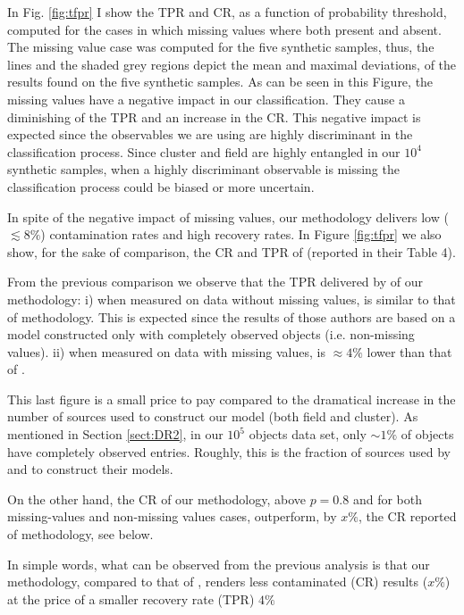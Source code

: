 In Fig. \ref{fig:tfpr} I show the TPR and CR, as a function of probability threshold, computed for the cases in which missing values where both present and absent. The missing value case was computed for the five synthetic samples, thus, the lines and the shaded grey regions depict the mean and maximal deviations, of the results found on the five synthetic samples. As can be seen in this Figure, the missing values have a negative impact in our classification. They cause a diminishing of the TPR  and an increase in the CR. This negative impact is expected since the observables we are using are highly discriminant in the classification process. Since cluster and field are highly entangled in our $10^4$ synthetic samples, when a highly discriminant observable is missing the classification process could be biased or more uncertain.

In spite of the negative impact of missing values, our methodology delivers low ($\lesssim 8\%$) contamination rates and high recovery rates. In Figure \ref{fig:tfpr} we also show, for the sake of comparison, the CR and TPR of \citet{Sarro2014} (reported in their Table 4). 

From the previous comparison we observe that the TPR delivered by of our methodology: i) when measured on data without missing values, is similar to that of \citet{Sarro2014} methodology. This is expected since the results of those authors are based on a model constructed only with completely observed objects (i.e. non-missing values). ii) when measured on data with missing values, is $\approx 4\%$ lower than that of \citet{Sarro2014}. 

This last figure is a small price to pay compared to the dramatical increase in the number of sources used to construct our model (both field and cluster). As mentioned in Section \ref{sect:DR2}, in our $10^5$ objects data set, only $\sim 1\%$ of objects have completely observed entries. Roughly, this is the fraction of sources used by \citet{Sarro2014} and \citet{Bouy2015} to construct their models. 

On the other hand, the CR of our methodology, above $p=0.8$ and for both missing-values and non-missing values cases, outperform, by $x\%$, the CR reported of \citet{Sarro2014} methodology, see below.

In simple words, what can be observed from the previous analysis is that our methodology, compared to that of \citet{Sarro2014}, renders less contaminated (CR) results ($x\%$) at the price of a smaller recovery rate (TPR) $4\%$

